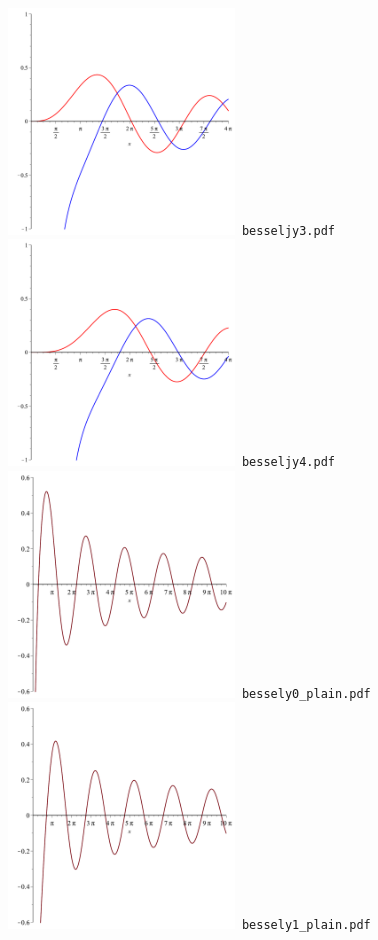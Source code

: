\documentclass[a4paper]{amsart}
\begin{document}
\includegraphics[width=6cm]{besseljy3.pdf}\verb+ besseljy3.pdf+\\
\includegraphics[width=6cm]{besseljy4.pdf}\verb+ besseljy4.pdf+\\
\includegraphics[width=6cm]{bessely0_plain.pdf}\verb+ bessely0_plain.pdf+\\
\includegraphics[width=6cm]{bessely1_plain.pdf}\verb+ bessely1_plain.pdf+\\
\end{document}
